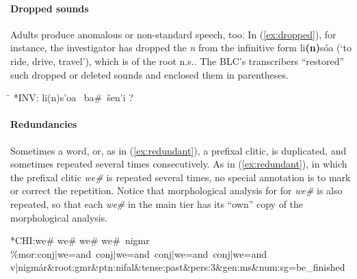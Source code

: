 \paragraph{Dropped sounds}
Adults produce anomalous or non-standard speech, too. In (\ref{ex:dropped}), for instance, the investigator 
has dropped the 
\emph{n} from the infinitive form 
\textsf{li\textbf{(n)}s\'oa} (`to ride, drive, travel'), 
which is of the root n.s.. 
The BLC's transcribers ``restored'' such dropped or deleted sounds and enclosed them in parentheses.
\begin{exe} \label{ex:dropped}
\ex \begin{tabbing}
\hspace{0.6in} \= \hspace{5.5in} \kill
\textsf{*INV:} \> \textsf{li(n)s\a'{o}a \, ba\#\, \v{s}en\a'{i} ?}
\end{tabbing}
\end{exe}

\paragraph{Redundancies}
Sometimes a word, or, as in (\ref{ex:redundant}), a prefixal clitic, is duplicated, and sometimes repeated
several times consecutively. As in (\ref{ex:redundant}), in which the prefixal clitic \textit{we\#} is 
repeated several times, no special annotation is to mark or correct the repetition. Notice that morphological analysis for
for \textit{we\#} is also repeated, so that each \textit{we\#} in the main tier has its ``own'' copy of the morphological analysis.
\begin{exe} \label{ex:redundant}
\ex \textsf{*CHI:\quad we\# we\# we\# we\#\, nigmr } \\
   \textsf{\%mor:\quad conj|we=and\, conj|we=and\, conj|we=and\, conj|we=and} \\
   \textsf{v|nigm\'ar\&root:gmr\&ptn:nifal\&tense:past\&pers:3\&gen:ms\&num:sg=be\_finished }
\end{exe}

 
